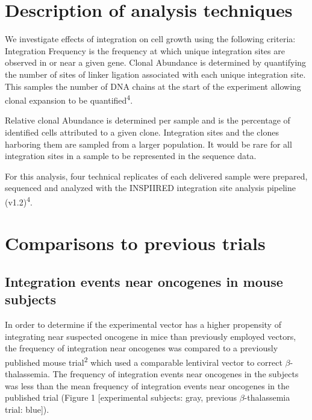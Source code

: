 \documentclass[12pt,]{article}
\begin{document}
\newpage

\section{Description of analysis
techniques}\label{description-of-analysis-techniques}

We investigate effects of integration on cell growth using the following
criteria: Integration Frequency is the frequency at which unique
integration sites are observed in or near a given gene. Clonal Abundance
is determined by quantifying the number of sites of linker ligation
associated with each unique integration site. This samples the number of
DNA chains at the start of the experiment allowing clonal expansion to
be quantified\textsuperscript{4}.

Relative clonal Abundance is determined per sample and is the percentage
of identified cells attributed to a given clone. Integration sites and
the clones harboring them are sampled from a larger population. It would
be rare for all integration sites in a sample to be represented in the
sequence data.

For this analysis, four technical replicates of each delivered sample
were prepared, sequenced and analyzed with the INSPIIRED integration
site analysis pipeline (v1.2)\textsuperscript{4}.

\newpage

\section{Comparisons to previous
trials}\label{comparisons-to-previous-trials}

\subsection{Integration events near oncogenes in mouse
subjects}\label{integration-events-near-oncogenes-in-mouse-subjects}

\vspace{0.1cm}

In order to determine if the experimental vector has a higher propensity
of integrating near suspected oncogene in mice than previously employed
vectors, the frequency of integration near oncogenes was compared to a
previously published mouse trial\textsuperscript{2} which used a
comparable lentiviral vector to correct \(\beta\)-thalassemia. The
frequency of integration events near oncogenes in the subjects was less
than the mean frequency of integration events near oncogenes in the
published trial (Figure 1 {[}experimental subjects: gray, previous
\(\beta\)-thalassemia trial: blue{]}).
\end{document}
